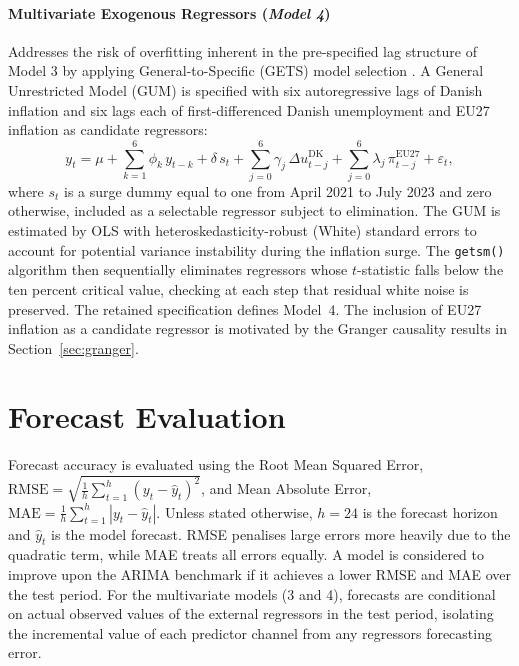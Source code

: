 \paragraph{Multivariate Exogenous Regressors (\textit{Model 4})} Addresses the risk of overfitting inherent in the
pre-specified lag structure of Model 3 by applying General-to-Specific (GETS)
model selection \parencite{doornik2014}. A General Unrestricted Model (GUM)
is specified with six autoregressive lags of Danish inflation and six lags each
of first-differenced Danish unemployment and EU27 inflation as
candidate regressors:
\begin{equation}
    y_t = \mu + \sum_{k=1}^{6} \phi_k\,y_{t-k}
    + \delta\,s_t
    + \sum_{j=0}^{6} \gamma_j\,\Delta u^{\text{DK}}_{t-j}
    + \sum_{j=0}^{6} \lambda_j\, \pi^{\text{EU27}}_{t-j}
    + \varepsilon_t,
\end{equation}
where $s_t$ is a surge dummy equal to one from April 2021 to July 2023 and zero otherwise, included as a selectable regressor subject to elimination. The GUM is estimated by OLS with heteroskedasticity-robust (White) standard errors to account for potential variance instability during the inflation surge. The \texttt{getsm()} algorithm then sequentially eliminates regressors whose $t$-statistic falls below the ten percent critical value, checking at each step that residual white noise is preserved. The retained specification defines Model~4. The inclusion of EU27 inflation as a candidate regressor is motivated by the Granger causality results in Section~\ref{sec:granger}.

\section{Forecast Evaluation}
Forecast accuracy is evaluated using the Root Mean Squared Error, $\text{RMSE} = \sqrt{\frac{1}{h}\sum_{t=1}^{h}(y_t - \hat{y}_t)^2}$, and
Mean Absolute Error, $\text{MAE}  = \frac{1}{h}\sum_{t=1}^{h}|y_t - \hat{y}_t|$. Unless stated otherwise, $h = 24$ is the forecast horizon and $\hat{y}_t$ is the model forecast. RMSE penalises large errors more heavily due to the quadratic term, while MAE treats all errors equally. A model is considered to improve upon the ARIMA benchmark if it achieves a lower RMSE and MAE over the test period. For the multivariate models (3 and 4), forecasts are conditional on actual observed values of the external regressors in the test period, isolating the incremental value of each predictor channel from any regressors forecasting error.

